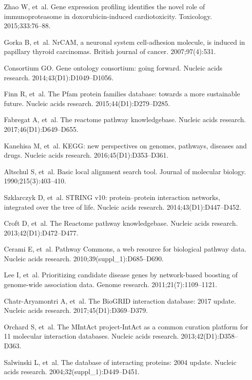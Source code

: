 \documentclass[10pt,letterpaper]{article}
\begin{document}
\begin{thebibliography}{10}
Zhao W, et~al.
\newblock Gene expression profiling identifies the novel role of
  immunoproteasome in doxorubicin-induced cardiotoxicity.
\newblock Toxicology. 2015;333:76--88.

Gorka B, et~al.
\newblock NrCAM, a neuronal system cell-adhesion molecule, is induced in
  papillary thyroid carcinomas.
\newblock British journal of cancer. 2007;97(4):531.

Consortium GO.
\newblock Gene ontology consortium: going forward.
\newblock Nucleic acids research. 2014;43(D1):D1049--D1056.

Finn R, et~al.
\newblock The Pfam protein families database: towards a more sustainable
  future.
\newblock Nucleic acids research. 2015;44(D1):D279--D285.

Fabregat A, et~al.
\newblock The reactome pathway knowledgebase.
\newblock Nucleic acids research. 2017;46(D1):D649--D655.

Kanehisa M, et~al.
\newblock KEGG: new perspectives on genomes, pathways, diseases and drugs.
\newblock Nucleic acids research. 2016;45(D1):D353--D361.

Altschul S, et~al.
\newblock Basic local alignment search tool.
\newblock Journal of molecular biology. 1990;215(3):403--410.

Szklarczyk D, et~al.
\newblock STRING v10: protein--protein interaction networks, integrated over
  the tree of life.
\newblock Nucleic acids research. 2014;43(D1):D447--D452.

Croft D, et~al.
\newblock The Reactome pathway knowledgebase.
\newblock Nucleic acids research. 2013;42(D1):D472--D477.

Cerami E, et~al.
\newblock Pathway Commons, a web resource for biological pathway data.
\newblock Nucleic acids research. 2010;39(suppl\_1):D685--D690.

Lee I, et~al.
\newblock Prioritizing candidate disease genes by network-based boosting of
  genome-wide association data.
\newblock Genome research. 2011;21(7):1109--1121.

Chatr-Aryamontri A, et~al.
\newblock The BioGRID interaction database: 2017 update.
\newblock Nucleic acids research. 2017;45(D1):D369--D379.

Orchard S, et~al.
\newblock The MIntAct project-IntAct as a common curation platform for 11
  molecular interaction databases.
\newblock Nucleic acids research. 2013;42(D1):D358--D363.

Salwinski L, et~al.
\newblock The database of interacting proteins: 2004 update.
\newblock Nucleic acids research. 2004;32(suppl\_1):D449--D451.

\end{thebibliography}



\clearpage
\begin{appendices}

\end{appendices}
\end{document}
